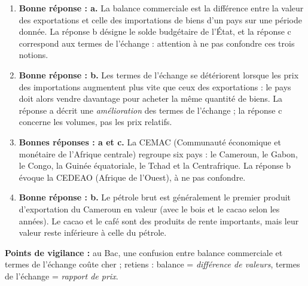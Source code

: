 \documentclass[11pt]{article}
\begin{document}
\begin{corrige}
\begin{enumerate}
\item \textbf{Bonne réponse : a.} La balance commerciale est la différence entre la valeur des exportations et celle des importations de biens d'un pays sur une période donnée. La réponse b désigne le solde budgétaire de l'État, et la réponse c correspond aux termes de l'échange : attention à ne pas confondre ces trois notions.
\item \textbf{Bonne réponse : b.} Les termes de l'échange se détériorent lorsque les prix des importations augmentent plus vite que ceux des exportations : le pays doit alors vendre davantage pour acheter la même quantité de biens. La réponse a décrit une \emph{amélioration} des termes de l'échange ; la réponse c concerne les volumes, pas les prix relatifs.
\item \textbf{Bonnes réponses : a et c.} La CEMAC (Communauté économique et monétaire de l'Afrique centrale) regroupe six pays : le Cameroun, le Gabon, le Congo, la Guinée équatoriale, le Tchad et la Centrafrique. La réponse b évoque la CEDEAO (Afrique de l'Ouest), à ne pas confondre.
\item \textbf{Bonne réponse : b.} Le pétrole brut est généralement le premier produit d'exportation du Cameroun en valeur (avec le bois et le cacao selon les années). Le cacao et le café sont des produits de rente importants, mais leur valeur reste inférieure à celle du pétrole.
\end{enumerate}
\textbf{Points de vigilance :} au Bac, une confusion entre balance commerciale et termes de l'échange coûte cher ; retiens : balance = \emph{différence de valeurs}, termes de l'échange = \emph{rapport de prix}.
\end{corrige}
\end{document}
